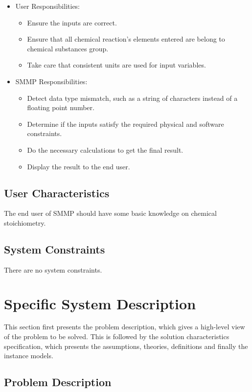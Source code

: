 \documentclass[12pt]{article}
\begin{document}
\begin{itemize}
\item User Responsibilities:
\begin{itemize}
\item Ensure the inputs are correct.
\item Ensure that all chemical reaction's elements entered are belong to chemical substances group.
\item Take care that consistent units are used for input variables.
\end{itemize}
\item SMMP Responsibilities:
\begin{itemize}
\item Detect data type mismatch, such as a string of characters instead of a
  floating point number.
\item Determine if the inputs satisfy the required physical and software constraints.
\item Do the necessary calculations to get the final result.
\item Display the result to the end user.
\end{itemize}
\end{itemize}

\subsection{User Characteristics} \label{SecUserCharacteristics}

The end user of SMMP should have some basic knowledge on chemical stoichiometry.

\subsection{System Constraints}

There are no system constraints.

\section{Specific System Description}

This section first presents the problem description, which gives a high-level
view of the problem to be solved.  This is followed by the solution characteristics
specification, which presents the assumptions, theories, definitions and finally
the instance models.  

\subsection{Problem Description} \label{Sec_pd}
\end{document}
